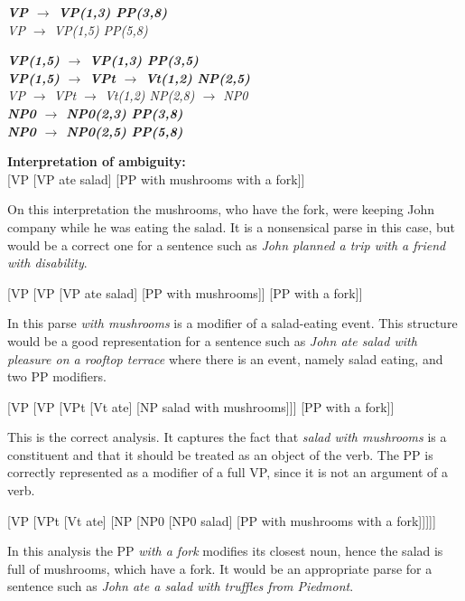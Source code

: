 \documentclass{article}
\begin{document}
\begin{center}
	\textbf{\emph{VP $\rightarrow$ VP(1,3) PP(3,8)}}\\
	
	\emph{VP $\rightarrow$ VP(1,5) PP(5,8)}
	
	\textbf{\emph{VP(1,5) $\rightarrow$ VP(1,3) PP(3,5)}\\
	\emph{VP(1,5) $\rightarrow$ VPt $\rightarrow$ Vt(1,2) NP(2,5)}}\\

	\emph{VP $\rightarrow$ VPt $\rightarrow$ Vt(1,2) NP(2,8) $\rightarrow$ NP0}\\
	\textbf{\emph{NP0 $\rightarrow$ NP0(2,3) PP(3,8)}\\
	\emph{NP0 $\rightarrow$ NP0(2,5) PP(5,8)}}
\end{center}

\textbf{Interpretation of ambiguity:}\\
{[}VP {[}VP ate salad{]} {[}PP with mushrooms with a fork{]}{]}

On this interpretation the mushrooms, who have the fork, were keeping John company while he was eating the salad. It is a nonsensical parse in this case, but would be a correct one for a sentence such as \emph{John planned a trip with a friend with disability}.

{[}VP {[}VP {[}VP ate salad{]} {[}PP with mushrooms{]}{]} {[}PP with a fork{]}{]}

In this parse \emph{with mushrooms} is a modifier of a salad-eating event. This structure would be a good representation for a sentence such as \emph{John ate salad with pleasure on a rooftop terrace} where there is an event, namely salad eating, and two PP modifiers.

{[}VP {[}VP {[}VPt {[}Vt ate{]} {[}NP salad with mushrooms{]}{]}{]} {[}PP with a fork{]}{]}

This is the correct analysis. It captures the fact that \emph{salad with mushrooms} is a constituent and that it should be treated as an object of the verb. The PP is correctly represented as a modifier of a full VP, since it is not an argument of a verb. 

{[}VP {[}VPt {[}Vt ate{]} {[}NP {[}NP0 {[}NP0 salad{]} {[}PP with mushrooms with a fork{]}{]}{]}{]}{]}

In this analysis the PP \emph{with a fork} modifies its closest noun, hence the salad is full of mushrooms, which have a fork. It would be an appropriate parse for a sentence such as \emph{John ate a salad with truffles from Piedmont}.
\end{document}
